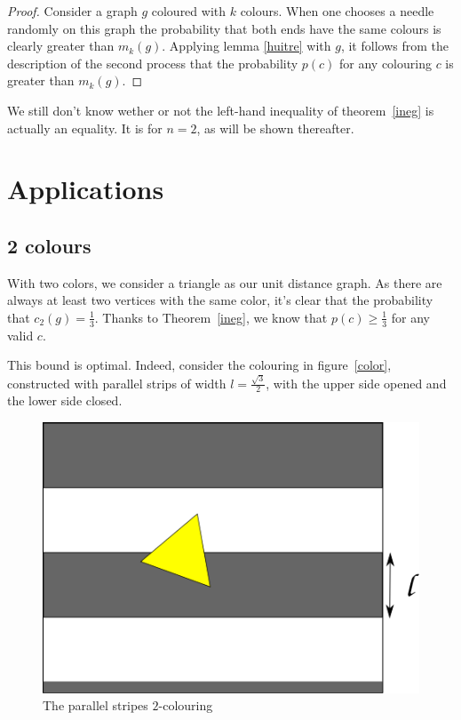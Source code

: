 \documentclass[a4paper,11pt]{article}
\theoremstyle{definition}
\theoremstyle{remark}
\begin{document}
\begin{proof}
Consider a graph $g$ coloured with $k$ colours. When one chooses a needle
randomly on this graph the probability that both ends have the same
colours is clearly greater than $m_k(g)$. Applying lemma \ref{huitre} with $g$, 
it follows from the description of the second process that the probability 
$p(c)$ for any colouring $c$ is greater than $m_k(g)$.
\end{proof}
We still don't know wether or not the left-hand inequality of theorem~\ref{ineg} is actually an equality. It is for 
$n=2$, as will be shown thereafter.

\section{Applications} \label{appli}
\subsection{2 colours}

With two colors, we consider a triangle as our unit distance graph. 
As there are always at least two vertices with the same color, it's clear that 
the probability that $c_2(g) = \frac{1}{3}$. Thanks to Theorem~\ref{ineg}, 
we know that $p(c) \geq \frac13$ for any valid $c$.

This bound is optimal. Indeed, consider the colouring in figure~\ref{color}, 
constructed with parallel strips of width 
$l = \frac {\sqrt3}{2}$, with the upper side opened and the lower side closed. 

\begin{figure}[h]
\center
\includegraphics[scale=0.5]{path6509.png}
\caption{\label{couleur} The parallel stripes $2$-colouring}
\end{figure}
\end{document}
